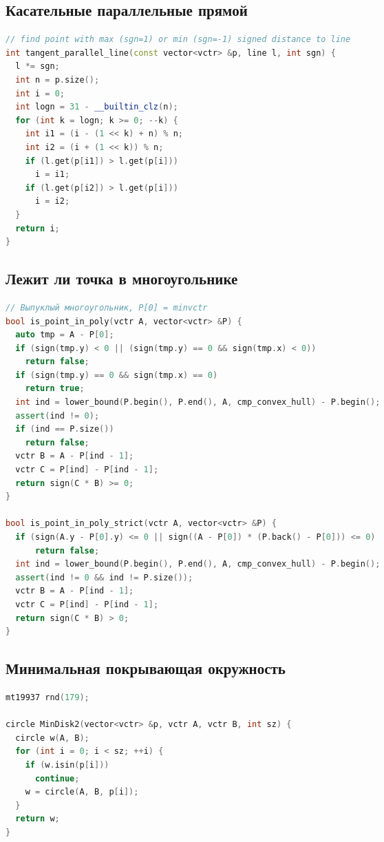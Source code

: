 \documentclass[9pt,a4paper,landscape,twosided]{extarticle}
\begin{document}
\begin{multicols*}{3}
\begin{lstlisting}[language=C++]
\end{lstlisting}

\subsection{Касательные параллельные прямой}
\begin{lstlisting}[language=C++]
// find point with max (sgn=1) or min (sgn=-1) signed distance to line
int tangent_parallel_line(const vector<vctr> &p, line l, int sgn) {
  l *= sgn;
  int n = p.size();
  int i = 0;
  int logn = 31 - __builtin_clz(n);
  for (int k = logn; k >= 0; --k) {
    int i1 = (i - (1 << k) + n) % n;
    int i2 = (i + (1 << k)) % n;
    if (l.get(p[i1]) > l.get(p[i]))
      i = i1;
    if (l.get(p[i2]) > l.get(p[i]))
      i = i2;
  }
  return i;
}

\end{lstlisting}

\subsection{Лежит ли точка в многоугольнике}
\begin{lstlisting}[language=C++]
// Выпуклый многоугольник, P[0] = minvctr
bool is_point_in_poly(vctr A, vector<vctr> &P) {
  auto tmp = A - P[0];
  if (sign(tmp.y) < 0 || (sign(tmp.y) == 0 && sign(tmp.x) < 0))
    return false;
  if (sign(tmp.y) == 0 && sign(tmp.x) == 0)
    return true;
  int ind = lower_bound(P.begin(), P.end(), A, cmp_convex_hull) - P.begin();
  assert(ind != 0);
  if (ind == P.size())
    return false;
  vctr B = A - P[ind - 1];
  vctr C = P[ind] - P[ind - 1];
  return sign(C * B) >= 0;
}

bool is_point_in_poly_strict(vctr A, vector<vctr> &P) {
  if (sign(A.y - P[0].y) <= 0 || sign((A - P[0]) * (P.back() - P[0])) <= 0)
      return false;
  int ind = lower_bound(P.begin(), P.end(), A, cmp_convex_hull) - P.begin();
  assert(ind != 0 && ind != P.size());
  vctr B = A - P[ind - 1];
  vctr C = P[ind] - P[ind - 1];
  return sign(C * B) > 0;
}

\end{lstlisting}

\subsection{Минимальная покрывающая окружность}
\begin{lstlisting}[language=C++]
mt19937 rnd(179);

circle MinDisk2(vector<vctr> &p, vctr A, vctr B, int sz) {
  circle w(A, B);
  for (int i = 0; i < sz; ++i) {
    if (w.isin(p[i]))
      continue;
    w = circle(A, B, p[i]);
  }
  return w;
}


\end{lstlisting}
\end{multicols*}
\end{document}
